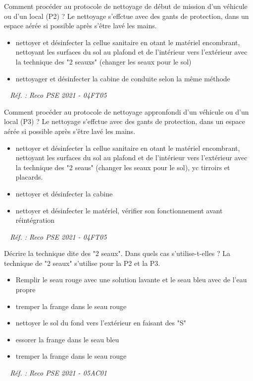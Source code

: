\documentclass[grid,avery5371,landscape]{flashcards}
\makeatletter
\newcounter{nocarte}
\newcommand{\categ}[1]{%
  \def\@categ{#1}%
  \setcounter{nocarte}{0}%
}
\newcommand{\source}[1]{%
  \medskip
  \itshape%
   ~ \hfill Réf. : #1}
\makeatother
\begin{document}
\color[HTML]{003273}
\categ{PSE}
\begin{flashcard}[matériel]{
 Comment procéder au protocole de nettoyage de début de mission d'un véhicule ou d'un local (P2) ?   }
  Le nettoyage s'effctue avec des gants de protection, dans un espace aérée si possible après s'être lavé les mains. \\ \begin{itemize} \item nettoyer et désinfecter la cellue sanitaire en otant le matériel encombrant, nettoyant les surfaces du sol au plafond et de l'intérieur vers l'extérieur avec la technique des "2 seauxs" (changer les seaux pour le sol) \item nettoyager et désinfecter la cabine de conduite selon la même méthode \end{itemize}
  \source{Reco PSE 2021 - 04FT05}
\end{flashcard}


\color[HTML]{003273}
\categ{PSE}
\begin{flashcard}[matériel]{
 Comment procéder au protocole de nettoyage appronfondi d'un véhicule ou d'un local (P3) ?   }
  Le nettoyage s'effctue avec des gants de protection, dans un espace aérée si possible après s'être lavé les mains. \\ \begin{itemize} \item nettoyer et désinfecter la cellue sanitaire en otant le matériel encombrant, nettoyant les surfaces du sol au plafond et de l'intérieur vers l'extérieur avec la technique des "2 seaus" (changer les seaux pour le sol), yc tirroirs et placards. \item nettoyer et désinfecter la cabine \item nettoyer et désinfecter le matériel, vérifier son fonctionnement avant réintégration \end{itemize}
  \source{Reco PSE 2021 - 04FT05}
\end{flashcard}


\color[HTML]{003273}
\categ{PSE}
\begin{flashcard}[matériel]{
 Décrire la technique dite des "2 seaux". Dans quels cas s'utilise-t-elles ?   }
  La technique de "2 seaux" s'utilise pour la P2 et la P3. \\ \begin{itemize} \item Remplir le seau rouge avec une solution lavante et le seau bleu avec de l'eau propre \item tremper la frange dans le seau rouge \item nettoyer le sol du fond vers l'extérieur en faisant des "S" \item essorer la frange dans le seau bleu \item tremper la frange dans le seau rouge \end{itemize}
  \source{Reco PSE 2021 - 05AC01}
\end{flashcard}
\end{document}
